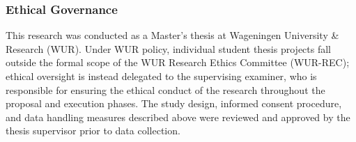 \subsubsection{Ethical Governance}
This research was conducted as a Master's thesis at Wageningen University \& Research (WUR). Under WUR policy, individual student thesis projects fall outside the formal scope of the WUR Research Ethics Committee (WUR-REC); ethical oversight is instead delegated to the supervising examiner, who is responsible for ensuring the ethical conduct of the research throughout the proposal and execution phases. The study design, informed consent procedure, and data handling measures described above were reviewed and approved by the thesis supervisor prior to data collection.
